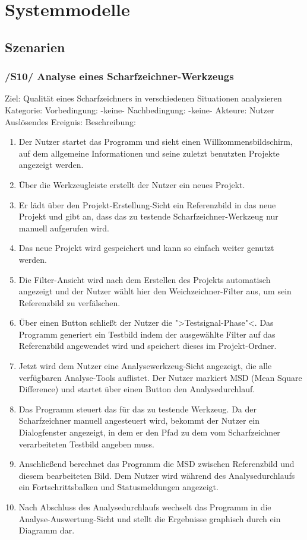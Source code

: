 \chapter{Systemmodelle}

\section{Szenarien}

\subsection{/S10/ Analyse eines Scharfzeichner-Werkzeugs}
Ziel: Qualität eines Scharfzeichners in verschiedenen Situationen analysieren
Kategorie: 
Vorbedingung: -keine-
Nachbedingung: -keine-
Akteure: Nutzer
Auslösendes Ereignis: 
Beschreibung:

\begin{enumerate}
\item Der Nutzer startet das Programm und sieht einen Willkommensbildschirm, auf dem allgemeine Informationen und seine zuletzt benutzten Projekte angezeigt werden.
\item Über die Werkzeugleiste erstellt der Nutzer ein neues Projekt.
\item Er lädt über den Projekt-Erstellung-Sicht ein Referenzbild in das neue Projekt und gibt an, dass das zu testende Scharfzeichner-Werkzeug nur manuell aufgerufen wird.
\item Das neue Projekt wird gespeichert und kann so einfach weiter genutzt werden.

\item Die Filter-Ansicht wird nach dem Erstellen des Projekts automatisch angezeigt und der Nutzer wählt hier den Weichzeichner-Filter aus, um sein Referenzbild zu verfälschen.
\item Über einen Button schließt der Nutzer die ">Testsignal-Phase"<. Das Programm generiert ein Testbild indem der ausgewählte Filter auf das Referenzbild angewendet wird und speichert dieses im Projekt-Ordner.
\item Jetzt wird dem Nutzer eine Analysewerkzeug-Sicht angezeigt, die alle verfügbaren Analyse-Tools auflistet. Der Nutzer markiert MSD (Mean Square Difference) und startet über einen Button den Analysedurchlauf.
\item Das Programm steuert das für das zu testende Werkzeug. Da der Scharfzeichner manuell angesteuert wird, bekommt der Nutzer ein Dialogfenster angezeigt, in dem er den Pfad zu dem vom Scharfzeichner verarbeiteten Testbild angeben muss.
\item Anschließend berechnet das Programm die MSD zwischen Referenzbild und diesem bearbeiteten Bild. Dem Nutzer wird während des Analysedurchlaufs ein Fortschrittsbalken und Statusmeldungen angezeigt.
\item Nach Abschluss des Analysedurchlaufs wechselt das Programm in die Analyse-Auswertung-Sicht und stellt die Ergebnisse graphisch durch ein Diagramm dar.
\end{enumerate}


